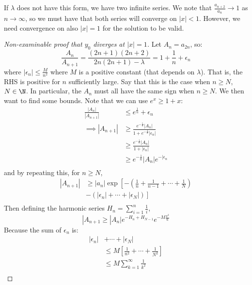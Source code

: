 \documentclass[../Main.tex]{subfiles}
\begin{document}
If $\lambda$ does not have this form, we have two infinite series. We note that $\frac{a_{n+2}}{a_n} \to 1$ as $n \to \infty$, so we must have that both series will converge on $|x| < 1$. However, we need convergence on also $|x| = 1$ for the solution to be valid.

\begin{proof}[Non-examinable proof that $y_0$ diverges at $|x| = 1$]
    Let $A_n = a_{2n}$, so:
    \begin{equation*}
        \frac{A_n}{A_{n+1}} = \frac{(2n+1)(2n+2)}{2n(2n+1) - \lambda} = 1 + \frac{1}{n} + \epsilon_n
    \end{equation*}
    where $|\epsilon_n| \leq \frac{M}{n^2}$ where $M$ is a positive constant (that depends on $\lambda$). That is, the RHS is positive for $n$ sufficiently large. Say that this is the case when $n \geq N$, $N \in \N$. In particular, the $A_n$ must all have the same sign when $n \geq N$.
    We then want to find some bounds. Note that we can use $e^x \geq 1 + x$:
    \begin{align*}
        \frac{|A_n|}{|A_{n+1}|} &\leq e^\frac1{n} + \epsilon_n \\
        \implies |A_{n+1}| & \geq \frac{e^{-\frac{1}{n}}|A_n|}{1 + e^{-\frac{1}{n}}|\epsilon_n|} \\
        &\geq \frac{e^{-\frac{1}{n}}|A_n|}{1 + |\epsilon_n|} \\
        &\geq e^{-\frac{1}{n}} |A_n|e^{-|\epsilon_n} \\
    \end{align*}
    and by repeating this, for $n \geq N$,
    \begin{align*}
        |A_{n+1}| &\geq |a_n| \exp\left[-\left(\frac{1}{n} + \frac{1}{n-1} + \cdots + \frac{1}{N}\right)\right. \\
        &- \left.\left(|\epsilon_n| + \cdots + |\epsilon_N|\right)\right] \\
    \end{align*}
    Then defining the harmonic series $H_n = \sum_{i=1}^{n} \frac{1}{i}$,
    \begin{equation*}
        |A_{n+1} \geq |A_n| e^{-H_n + H_{N-1}} e^{-M\frac{\pi^2}{6}}
    \end{equation*}
    Because the sum of $\epsilon_n$ is:
    \begin{align*}
        |\epsilon_n| &+ \cdots + |\epsilon_N| \\
        &\leq M\left[\frac{1}{n^2} + \cdots + \frac{1}{N^2}\right] \\
        &\leq M\sum_{k=1}^\infty \frac{1}{k^2} \\

\end{align*}
\end{proof}
\end{document}
